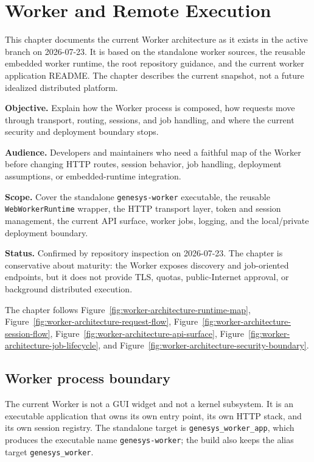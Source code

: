 \chapter{Worker and Remote Execution}
\label{chap:worker-and-remote-execution}

This chapter documents the current Worker architecture as it exists in the active branch on 2026-07-23. It is based on the standalone worker sources, the reusable embedded worker runtime, the root repository guidance, and the current worker application README. The chapter describes the current snapshot, not a future idealized distributed platform.

\noindent\textbf{Objective.} Explain how the Worker process is composed, how requests move through transport, routing, sessions, and job handling, and where the current security and deployment boundary stops.

\noindent\textbf{Audience.} Developers and maintainers who need a faithful map of the Worker before changing HTTP routes, session behavior, job handling, deployment assumptions, or embedded-runtime integration.

\noindent\textbf{Scope.} Cover the standalone \texttt{genesys-worker} executable, the reusable \texttt{WebWorkerRuntime} wrapper, the HTTP transport layer, token and session management, the current API surface, worker jobs, logging, and the local/private deployment boundary.

\noindent\textbf{Status.} Confirmed by repository inspection on 2026-07-23. The chapter is conservative about maturity: the Worker exposes discovery and job-oriented endpoints, but it does not provide TLS, quotas, public-Internet approval, or background distributed execution.

The chapter follows Figure~\ref{fig:worker-architecture-runtime-map},
Figure~\ref{fig:worker-architecture-request-flow},
Figure~\ref{fig:worker-architecture-session-flow},
Figure~\ref{fig:worker-architecture-api-surface},
Figure~\ref{fig:worker-architecture-job-lifecycle}, and
Figure~\ref{fig:worker-architecture-security-boundary}.

\section{Worker process boundary}
\label{sec:worker-architecture-process-boundary}

The current Worker is not a GUI widget and not a kernel subsystem. It is an executable application that owns its own entry point, its own HTTP stack, and its own session registry. The standalone target is \texttt{genesys\_worker\_app}, which produces the executable name \texttt{genesys-worker}; the build also keeps the alias target \texttt{genesys\_worker}.

